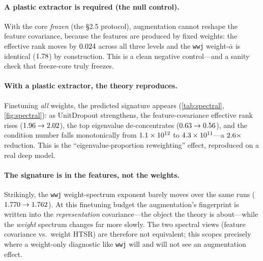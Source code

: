 \documentclass{article} %
\newcommand{\wwj}{\texttt{wwj}\xspace}
\newcommand{\rtwo}{$R^2$\xspace}
\begin{document}
\paragraph{A plastic extractor is required (the null control).} With the core \emph{frozen}
(the \S2.5 protocol), augmentation cannot reshape the feature covariance, because the features
are produced by fixed weights: the effective rank moves by $0.024$ across all
three levels and the \wwj weight-$\bar\alpha$ is identical ($1.78$) by construction.
This is a clean negative control---and a sanity check that freeze-core truly freezes.

\paragraph{With a plastic extractor, the theory reproduces.} Finetuning \emph{all} weights, the
predicted signature appears (\cref{tab:spectral}, \cref{fig:spectral}): as UnitDropout
strengthens, the feature-covariance effective rank rises ($1.96\to2.02$), the top
eigenvalue de-concentrates ($0.63\to0.56$), and the condition number falls
monotonically from $1.1\times10^{12}$ to $4.3\times10^{11}$---a $\augCondDrop\times$ reduction. This is
the \citeauthor{lin2024augmentation} ``eigenvalue-proportion reweighting'' effect, reproduced
on a real deep model.

\paragraph{The signature is in the features, not the weights.} Strikingly, the \wwj weight-spectrum
exponent barely moves over the same runs ($1.770\to1.762$). At this
finetuning budget the augmentation's fingerprint is written into the \emph{representation}
covariance---the object the theory is about---while the \emph{weight} spectrum changes far more
slowly. The two spectral views (feature covariance vs.\ weight HTSR) are therefore not
equivalent; this scopes precisely where a weight-only diagnostic like \wwj will and will not
see an augmentation effect.

\begin{table}[t]
\centering
\caption{Finetune-all UnitDropout ablation (held-out monkey~t). As augmentation strengthens,
the readout-input feature covariance spreads (effective rank up, top-1 fraction down, condition
number down $\augCondDrop\times$), while the \wwj weight-spectrum $\bar\alpha$ is nearly
constant. Decode \rtwo{} is flat because the full-data decode is near-saturated.}
\label{tab:spectral}
\poyoSpectralTable
\end{table}
\end{document}
